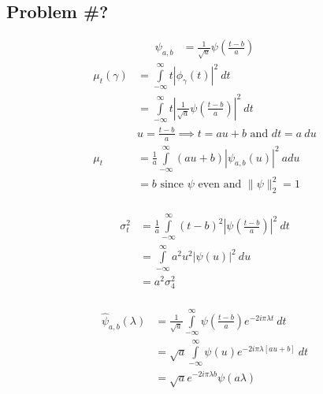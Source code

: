 \subsection{Problem #?}
\label{subsec:Problem #?}
\begin{align*}
    \psi_{a,b} &= \frac{ 1 }{ \sqrt{a}  } \psi\left( \frac{ t-b }{ a } \right) 
\end{align*}
\begin{align*}
    \mu_t(\gamma)  &= \int\limits_{-\infty}^{\infty} t \left | \phi_{\gamma} (t) \right |
    ^2 \ dt \\ 
     &= \int\limits_{-\infty}^{\infty} t \left | \frac{ 1 }{ \sqrt{a}  } \psi\left( \frac{ t-b }{ a } \right)\right |^2 \ dt \\  
      &u = \frac{ t-b }{ a }  \implies t = au+b \text{ and } dt = a \ du\\ 
      \mu_t &= \frac{ 1 }{ a } \int\limits_{-\infty}^{\infty} \left( au+b\right) \left |
      \psi_{a,b} (u)  \right | ^2 \ adu  \\
       &= b \text{ since } \psi \text{ even and  } \| \psi  \|^{ 2}_{ 2} = 1 \\ 
\end{align*}

\begin{align*}
    \sigma_t^2 &= \frac{ 1 }{ a } \int\limits_{-\infty}^{\infty} \left( t-b\right) ^2 \left
    | \psi \left( \frac{ t-b }{ a } \right)  \right | ^2 \ dt \\ 
     &= \int\limits_{-\infty}^{\infty} a^2 u^2 \left | \psi\left( u\right)  \right | ^2 \
     du \\ 
      &= a^2\sigma_4^2 \\ 
\end{align*}

\begin{align*}
    \widehat{\psi}_{a,b} (\lambda)   &= \frac{ 1 }{ \sqrt{a}  }
    \int\limits_{-\infty}^{\infty} \psi \left( \frac{ t-b }{ a }\right)   e^{
    -2i\pi\lambda t} \ dt  \\ 
                                     &= \sqrt{a} 
    \int\limits_{-\infty}^{\infty} \psi \left( u \right)   e^{
    -2i\pi\lambda[au+b] } \ dt  \\ 
                                     &= \sqrt{a} e^{ -2i\pi\lambda b} \psi(a\lambda)  \\ 
\end{align*}

